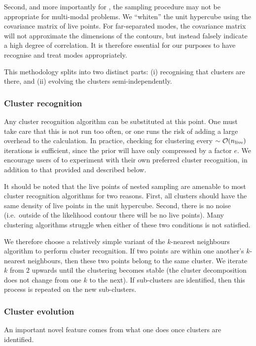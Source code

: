 Second, and more importantly for \PolyChord{}, the sampling procedure may not be appropriate for multi-modal problems. We ``whiten'' the unit hypercube using the covariance matrix of live points. For far-separated modes, the covariance matrix will not approximate the dimensions of the contours, but instead falsely indicate a high degree of correlation.  It is therefore essential for our purposes to have \PolyChord{} recognise and treat modes appropriately.


This methodology splits into two distinct parts:
  (i) recognising that clusters are there, and
  (ii) evolving the clusters semi-independently.

\subsubsection{Cluster recognition}
\label{sec:pc:clustering_recognition}
Any cluster recognition algorithm can be substituted at this point.  One must take care that this is not run too often, or one runs the risk of adding a large overhead to the calculation.  In practice, checking for clustering every \({\sim\mathcal{O}{\left(n_{\mathrm{live}}\right)}}\) iterations is sufficient, since the prior will have only compressed by a factor \(e\).  We encourage users of \PolyChord{} to experiment with their own preferred cluster recognition, in addition to that provided and described below. 

It should be noted that the live points of nested sampling are amenable to most cluster recognition algorithms for two reasons.  First, all clusters should have the same density of live points in the unit hypercube.  Second, there is no noise (i.e.\ outside of the likelihood contour there will be no live points). Many clustering algorithms struggle when either of these two conditions is not satisfied.

We therefore choose a relatively simple variant of the \(k\)-nearest neighbours algorithm to perform cluster recognition.  If two points are within one another's \(k\)-nearest neighbours, then these two points belong to the same cluster.  We iterate \(k\) from \(2\) upwards until the clustering becomes stable (the cluster decomposition does not change from one \(k\) to the next).  If sub-clusters are identified, then this process is repeated on the new sub-clusters.

\subsubsection{Cluster evolution}
\label{sec:pc:clustering_evolution}
An important novel feature comes from what one does once clusters are identified. 

